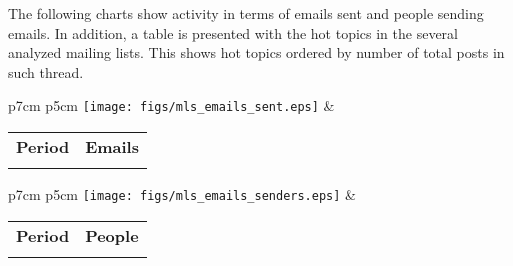 


The following charts show activity in terms of emails sent and people sending emails. In addition, a table is presented with the hot topics in the several analyzed mailing lists. This shows hot topics ordered by number of total posts in such thread.

\begin{tabular}{p{7cm} p{5cm}}
    \vspace{0pt} 
    \texttt{[image: figs/mls\_emails\_sent.eps]}
    & 
    \vspace{0pt}
    \begin{tabular}{l|l}%
    \bfseries Period & \bfseries Emails %
    \csvreader[head to column names]{data/mls_emails_sent.csv}{}%
    {\\ & \emailssent}
    \end{tabular}
\end{tabular}

\begin{tabular}{p{7cm} p{5cm}}
    \vspace{0pt} 
    \texttt{[image: figs/mls\_emails\_senders.eps]}
    & 
    \vspace{0pt}
    \begin{tabular}{l|l}%
    \bfseries Period & \bfseries People %
    \csvreader[head to column names]{data/mls_emails_senders.csv}{}%
    {\\ & \emailssenders}
    \end{tabular}
\end{tabular}


